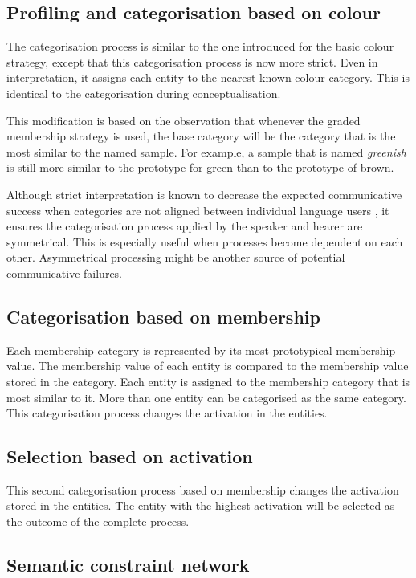 \subsection{Profiling and categorisation based on colour}

The categorisation process is similar to the one introduced for the
basic colour strategy, except that this categorisation process
is now more strict. Even in interpretation, it assigns each entity to
the nearest known colour category. This is identical to the
categorisation during conceptualisation.

This modification is based on the observation that whenever the
graded membership strategy is used, the base category will be
the category that is the most similar to the named sample. For
example, a sample that is named \textit{greenish} is still more similar to
the prototype for green than to the prototype of brown.

Although strict interpretation is known to decrease the expected
communicative success when categories are not aligned between
individual language users \citep{belpaeme07language}, it ensures the
categorisation process applied by the speaker and hearer are
symmetrical. This is especially useful when processes become dependent
on each other. Asymmetrical processing might be another source of
potential communicative failures.

\subsection{Categorisation based on membership}

Each membership category is represented by its most prototypical
membership value. The membership value of each entity is compared to
the membership value stored in the category. Each entity is assigned
to the membership category that is most similar to it. More than one
entity can be categorised as the same category. This categorisation
process changes the activation in the entities.

\subsection{Selection based on activation}

This second categorisation process based on membership changes the
activation stored in the entities. The entity with the highest
activation will be selected as the outcome of the complete process.

\subsection{Semantic constraint network}

